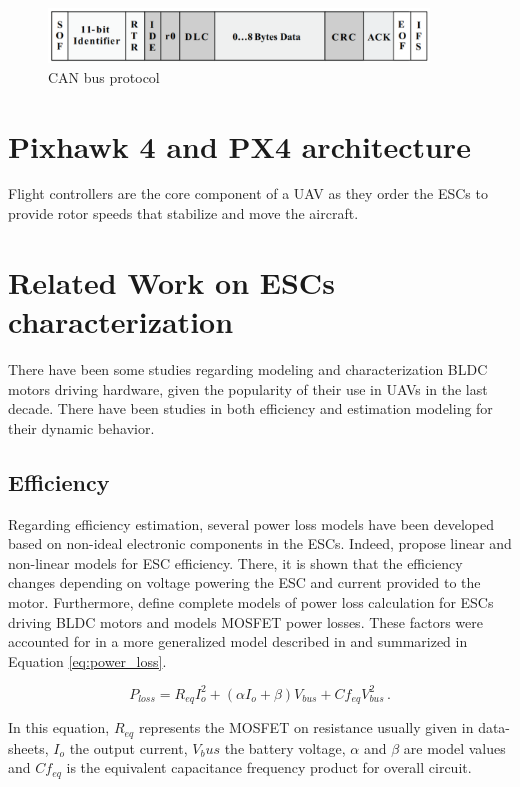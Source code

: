 \begin{figure}
    \centering
    \includegraphics[width=0.9\textwidth]{images/canbus_sketch.png}
    \caption{CAN bus protocol \cite{Corrigan2016}}
    \label{fig:canbus}
\end{figure}



\section{Pixhawk 4 and PX4 architecture}
Flight controllers are the core component of a UAV as they order the ESCs to provide rotor speeds that stabilize and move the aircraft. 

\section{Related Work on ESCs characterization}

There have been some studies regarding modeling and characterization BLDC motors driving hardware, given the popularity of their use in UAVs in the last decade. There have been studies in both efficiency and estimation modeling for their dynamic behavior. 
\subsection{Efficiency}
Regarding efficiency estimation, several power loss models have been developed based on non-ideal electronic components in the ESCs. Indeed, \cite{Gong2017,Gong2018} propose linear and non-linear models for ESC efficiency. There, it is shown that the efficiency changes depending on voltage powering the ESC and current provided to the motor.  Furthermore, \cite{Millett2012, Keskar} define complete models of power loss calculation for ESCs driving BLDC motors and \cite{Graovac2006} models MOSFET power losses. These factors were accounted for in a more generalized model described in \cite{Tritium2013} and summarized in Equation \ref{eq:power_loss}.

\begin{equation}
  P_{loss}=R_{eq}I_o^2+(\alpha I_o+\beta)V_{bus}+Cf_{eq}V_{bus}^2\, .
    \label{eq:power_loss}
\end{equation}

In this equation, $R_{eq}$ represents the MOSFET on resistance usually given in data-sheets, $I_o$ the output current, $V_bus$ the battery voltage, $\alpha$ and $\beta$ are model values and $Cf_{eq}$ is the equivalent capacitance frequency product for overall circuit.

